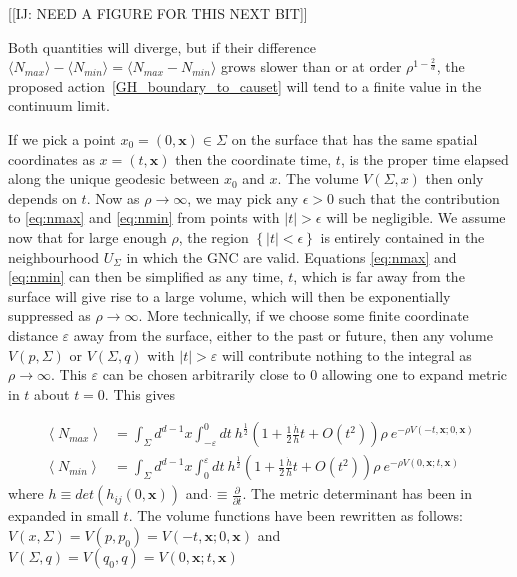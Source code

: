 \documentclass[12pt]{article}
\begin{document}
[[IJ: NEED A FIGURE FOR THIS NEXT BIT]]

Both quantities will diverge, but if their difference $\langle N_{max}\rangle - \langle N_{min}\rangle = \langle N_{max} - N_{min}\rangle$ grows slower than or at order $\rho^{1-\frac2d}$, the proposed action~\eqref{GH_boundary_to_causet} will tend to a finite value in the continuum limit. 

If we pick a point $x_0=(0,\mathbf{x})\in \Sigma$ on the surface that has the same spatial coordinates as $x=(t,\mathbf{x})$ then the coordinate time, $t$, is the proper time elapsed along the unique geodesic between $x_0$ and $x$. The volume $V(\Sigma,x)$ then only depends on $t$. Now as $\rho\rightarrow\infty$, we may pick any $\epsilon>0$ such that the contribution to \eqref{eq:nmax} and \eqref{eq:nmin} from points with $|t|>\epsilon$ will be negligible. We assume now that for large enough $\rho$, the region $\left\{|t|<\epsilon\right\}$ is entirely contained in the neighbourhood $U_\Sigma$ in which the GNC are valid.
Equations \eqref{eq:nmax} and \eqref{eq:nmin} can then be simplified as any time, $t$, which is far away from the surface will give rise to a large volume, which will then be exponentially suppressed as $\rho \rightarrow \infty$. More technically, if we choose some finite coordinate distance $\varepsilon$ away from the surface, either to the past or future, then any volume $V(p,\Sigma)$ or $V(\Sigma,q)$ with $|t|>\varepsilon$ will contribute nothing to the integral as $\rho \rightarrow \infty$. This $\varepsilon$ can be chosen arbitrarily close to $0$ allowing one to expand metric in $t$ about $t=0$. This gives

\begin{align}\label{eq:nmax_and_eq:nmin}
\left\langle N_{max}\right\rangle & =\int_{\Sigma}d^{d-1}x\int_{-\varepsilon}^{0}dt\:
h^{\frac{1}{2}}\left(1+
\frac{1}{2}\frac{\dot{h}}{h}t+O(t^2)\right)
 \rho\ e^{-\rho V(-t,\mathbf{x};0,\mathbf{x})}
\\
\left\langle N_{min}\right\rangle & =\int_{\Sigma}d^{d-1}x\int_{0}^{\varepsilon}dt\:
h^{\frac{1}{2}}\left(1+
\frac{1}{2}\frac{\dot{h}}{h}t+O(t^2)\right) \rho\ e^{-\rho V(0,\mathbf{x};t,\mathbf{x})}
\end{align}
where $h\equiv det\left(h_{ij}(0,\mathbf{x})\right)$ and $\dot{}\equiv \frac{\partial}{\partial t}$. The metric determinant has been in expanded in small $t$. The volume functions have been rewritten as follows: $V(x,\Sigma)=V(p,p_0)=V(-t,\mathbf{x};0,\mathbf{x})$ and $V(\Sigma,q)=V(q_0,q)=V(0,\mathbf{x};t,\mathbf{x})$
\end{document}
